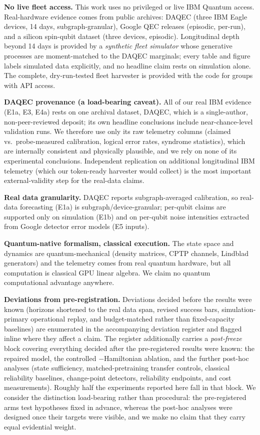 \documentclass[journal]{IEEEtran}
\begin{document}
\textbf{No live fleet access.} This work uses no privileged or live IBM Quantum
access. Real-hardware evidence comes from public archives: DAQEC (three IBM Eagle
devices, 14 days, subgraph-granular), Google QEC releases (episodic, per-run), and a
silicon spin-qubit dataset (three devices, episodic). Longitudinal depth beyond 14 days is
provided by a \emph{synthetic fleet simulator} whose generative processes are
moment-matched to the DAQEC marginals; every table and figure labels simulated data
explicitly, and no headline claim rests on simulation alone. The complete, dry-run-tested
fleet harvester is provided with the code for groups with API access.

\textbf{DAQEC provenance (a load-bearing caveat).} All of our real IBM evidence
(E1a, E3, E4a) rests on one archival dataset, DAQEC, which is a single-author,
non-peer-reviewed deposit; its own headline conclusions include near-chance-level
validation runs. We therefore use only its raw telemetry columns (claimed vs.\
probe-measured calibration, logical error rates, syndrome statistics), which are
internally consistent and physically plausible, and we rely on none of its
experimental conclusions. Independent replication on additional longitudinal IBM
telemetry (which our token-ready harvester would collect) is the most important
external-validity step for the real-data claims.

\textbf{Real data granularity.} DAQEC reports subgraph-averaged calibration, so
real-data forecasting (E1a) is subgraph/device-granular; per-qubit claims are supported
only on simulation (E1b) and on per-qubit noise intensities extracted from Google
detector error models (E5 inputs).

\textbf{Quantum-native formalism, classical execution.} The state space and dynamics are
quantum-mechanical (density matrices, CPTP channels, Lindblad generators) and the
telemetry comes from real quantum hardware, but all computation is classical GPU
linear algebra. We claim no quantum computational advantage anywhere.

\textbf{Deviations from pre-registration.} Deviations decided before the results were
known (horizons shortened to the real data span, revised success bars,
simulation-primary operational replay, and budget-matched rather than fixed-capacity
baselines) are enumerated in the accompanying deviation register and flagged inline
where they affect a claim. The register additionally carries a \emph{post-freeze}
block covering everything decided after the pre-registered results were known: the
repaired model, the controlled $-$Hamiltonian ablation, and the further post-hoc
analyses (state sufficiency, matched-pretraining transfer controls,
classical reliability baselines, change-point detectors, reliability endpoints, and
cost measurements). Roughly half the experiments reported here fall in that block. We
consider the distinction load-bearing rather than procedural: the pre-registered arms
test hypotheses fixed in advance, whereas the post-hoc analyses were designed once
their targets were visible, and we make no claim that they carry equal evidential
weight.
\end{document}
